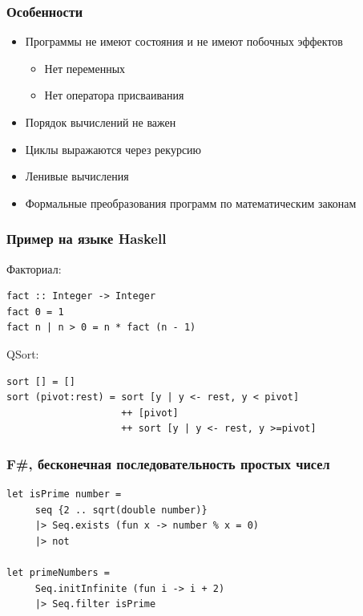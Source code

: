\documentclass[xetex,mathserif,serif]{beamer}
\begin{document}
    \begin{frame}
        \frametitle{Особенности}
        \begin{itemize}
            \item Программы не имеют состояния и не имеют побочных эффектов
            \begin{itemize}
                \item Нет переменных
                \item Нет оператора присваивания
            \end{itemize}
            \item Порядок вычислений не важен
            \item Циклы выражаются через рекурсию
            \item Ленивые вычисления
            \item Формальные преобразования программ по математическим законам
        \end{itemize}
    \end{frame}

    \begin{frame}[fragile]
        \frametitle{Пример на языке Haskell}
        Факториал:
        \begin{verbatim}
fact :: Integer -> Integer 
fact 0 = 1 
fact n | n > 0 = n * fact (n - 1) 
        \end{verbatim}

        QSort:
        \begin{verbatim}
sort [] = [] 
sort (pivot:rest) = sort [y | y <- rest, y < pivot] 
                    ++ [pivot]
                    ++ sort [y | y <- rest, y >=pivot] 

        \end{verbatim}
    \end{frame}

    \begin{frame}[fragile]
        \frametitle{F\#, бесконечная последовательность простых чисел}
        \begin{verbatim}
let isPrime number =
     seq {2 .. sqrt(double number)}
     |> Seq.exists (fun x -> number % x = 0) 
     |> not

let primeNumbers =
     Seq.initInfinite (fun i -> i + 2)
     |> Seq.filter isPrime
        \end{verbatim}
    \end{frame}
\end{document}
